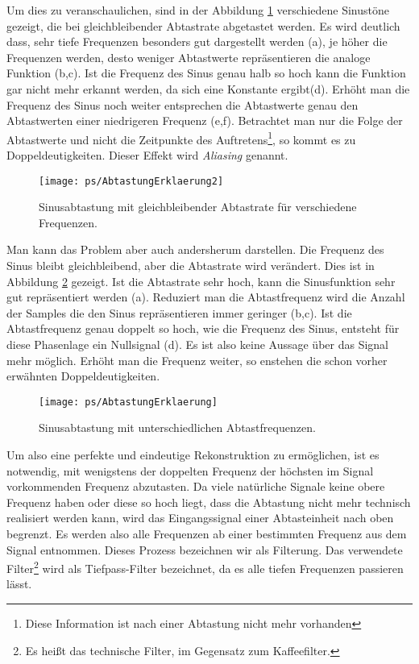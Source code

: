 Um dies zu veranschaulichen, sind in der Abbildung \ref{pic:ABtastungErklaerung1}
verschiedene Sinustöne gezeigt, die
bei gleichbleibender Abtastrate abgetastet werden. Es wird deutlich dass, sehr tiefe Frequenzen
besonders gut dargestellt werden (a), je höher die Frequenzen werden, desto weniger Abtastwerte
repräsentieren die analoge Funktion (b,c). Ist die Frequenz des Sinus genau halb so hoch
kann die Funktion gar nicht mehr erkannt werden, da sich eine Konstante ergibt(d).
Erhöht man die Frequenz des Sinus noch weiter entsprechen die Abtastwerte genau den
Abtastwerten einer niedrigeren Frequenz (e,f). Betrachtet man nur die Folge der Abtastwerte
und nicht die Zeitpunkte
des Auftretens\footnote{Diese Information ist nach einer Abtastung nicht mehr vorhanden}, so kommt es
zu Doppeldeutigkeiten. Dieser
Effekt wird {\em Aliasing} genannt.
\begin{figure}[H]
\begin{center}
\texttt{[image: ps/AbtastungErklaerung2]}
\caption{\label{pic:ABtastungErklaerung1} Sinusabtastung mit gleichbleibender Abtastrate
für verschiedene Frequenzen.}
\end{center}
\end{figure}

Man kann das Problem aber auch andersherum darstellen. Die Frequenz des Sinus bleibt
gleichbleibend, aber die Abtastrate wird verändert.
Dies ist in Abbildung \ref{pic:ABtastungErklaerung2} gezeigt. Ist die
Abtastrate sehr hoch, kann die Sinusfunktion sehr gut repräsentiert
werden (a). Reduziert man die Abtastfrequenz wird die Anzahl der Samples
die den Sinus repräsentieren immer geringer (b,c). Ist die Abtastfrequenz
genau doppelt so hoch, wie die Frequenz des Sinus, entsteht für diese
Phasenlage ein Nullsignal (d). Es ist also keine Aussage über das Signal mehr möglich.
Erhöht man die Frequenz weiter, so enstehen die schon vorher erwähnten Doppeldeutigkeiten.
\begin{figure}[H]
\begin{center}
\texttt{[image: ps/AbtastungErklaerung]}
\caption{\label{pic:ABtastungErklaerung2} Sinusabtastung mit unterschiedlichen
Abtastfrequenzen.}
\end{center}
\end{figure}

Um also eine perfekte und eindeutige
Rekonstruktion zu ermöglichen, ist es notwendig, mit wenigstens der doppelten
Frequenz der höchsten im Signal vorkommenden Frequenz abzutasten. Da viele natürliche Signale
keine obere Frequenz haben oder diese so hoch liegt, dass die Abtastung nicht mehr
technisch realisiert werden kann, wird das Eingangssignal einer Abtasteinheit
nach oben begrenzt. Es werden also alle Frequenzen ab einer bestimmten Frequenz aus dem Signal entnommen.
Dieses Prozess bezeichnen wir als Filterung. Das verwendete Filter\footnote{Es heißt
das technische Filter, im Gegensatz zum Kaffeefilter.} wird als Tiefpass-Filter
bezeichnet, da es alle tiefen Frequenzen passieren lässt.

